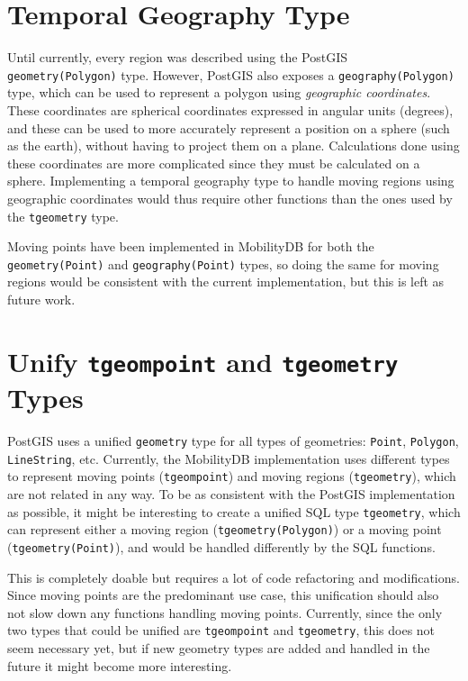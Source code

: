 
\section{Temporal Geography Type}
\label{section:tgeography}

Until currently, every region was described using the PostGIS \lstinline{geometry(Polygon)} type. However, PostGIS also exposes a \lstinline{geography(Polygon)} type, which can be used to represent a polygon using \textit{geographic coordinates}. These coordinates are spherical coordinates expressed in angular units (degrees), and these can be used to more accurately represent a position on a sphere (such as the earth), without having to project them on a plane. Calculations done using these coordinates are more complicated since they must be calculated on a sphere. Implementing a temporal geography type to handle moving regions using geographic coordinates would thus require other functions than the ones used by the \lstinline+tgeometry+ type. 

Moving points have been implemented in MobilityDB for both the \lstinline{geometry(Point)} and \lstinline{geography(Point)} types, so doing the same for moving regions would be consistent with the current implementation, but this is left as future work.

\section{Unify \texttt{tgeompoint} and \texttt{tgeometry} Types}
\label{section:tgeompoint}

PostGIS uses a unified \lstinline{geometry} type for all types of geometries: \lstinline+Point+, \lstinline+Polygon+, \lstinline+LineString+, etc. Currently, the MobilityDB implementation uses different types to represent moving points (\lstinline{tgeompoint}) and moving regions (\lstinline{tgeometry}), which are not related in any way. To be as consistent with the PostGIS implementation as possible, it might be interesting to create a unified SQL type \lstinline{tgeometry}, which can represent either a moving region (\lstinline{tgeometry(Polygon)}) or a moving point (\lstinline{tgeometry(Point)}), and would be handled differently by the SQL functions.

This is completely doable but requires a lot of code refactoring and modifications. Since moving points are the predominant use case, this unification should also not slow down any functions handling moving points. Currently, since the only two types that could be unified are \lstinline{tgeompoint} and \lstinline{tgeometry}, this does not seem necessary yet, but if new geometry types are added and handled in the future it might become more interesting.